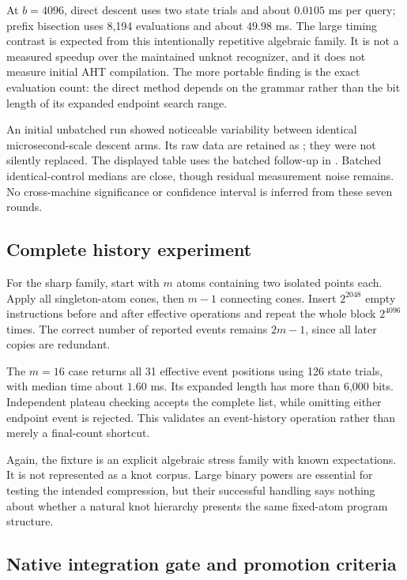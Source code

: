 At $b=4096$, direct descent uses two state trials and about $0.0105$ ms per
query; prefix bisection uses 8,194 evaluations and about $49.98$ ms. The
large timing contrast is expected from this intentionally repetitive
algebraic family. It is not a measured speedup over the maintained unknot
recognizer, and it does not measure initial AHT compilation. The more
portable finding is the exact evaluation count: the direct method depends
on the grammar rather than the bit length of its expanded endpoint search
range.

An initial unbatched run showed noticeable variability between identical
microsecond-scale descent arms. Its raw data are retained as
; they were not silently
replaced. The displayed table uses the batched follow-up in
. Batched identical-control medians are close,
though residual measurement noise remains. No cross-machine significance
or confidence interval is inferred from these seven rounds.

\subsection{Complete history experiment}

For the sharp family, start with $m$ atoms containing two isolated points
each. Apply all singleton-atom cones, then $m-1$ connecting cones. Insert
$2^{2048}$ empty instructions before and after effective operations and
repeat the whole block $2^{4096}$ times. The correct number of reported
events remains $2m-1$, since all later copies are redundant.



The $m=16$ case returns all 31 effective event positions using 126 state
trials, with median time about $1.60$ ms. Its expanded length has more than
6,000 bits. Independent plateau checking accepts the complete list, while
omitting either endpoint event is rejected. This validates an event-history
operation rather than merely a final-count shortcut.

Again, the fixture is an explicit algebraic stress family with known
expectations. It is not represented as a knot corpus. Large binary powers
are essential for testing the intended compression, but their successful
handling says nothing about whether a natural knot hierarchy presents the
same fixed-atom program structure.

\subsection{Native integration gate and promotion criteria}

